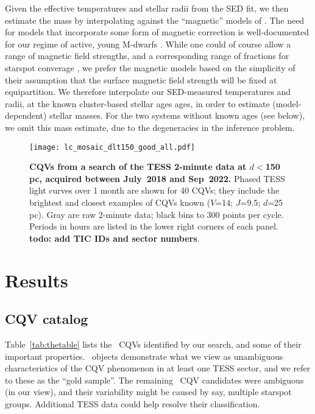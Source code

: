 \documentclass[11pt,twocolumn,tighten]{aastex63}
\begin{document}
Given the effective temperatures and stellar radii from the SED fit,
we then estimate the mass by interpolating against the ``magnetic''
models of \citet{2016A&A...593A..99F}.  The need for models that
incorporate some form of magnetic correction is well-documented for
our regime of active, young M-dwarfs
\citep[e.g.][]{2012ApJ...756...47S,2015ApJ...804..146D,2020ApJ...891...29S}.
While one could of course allow a range of magnetic field strengths,
and a corresponding range of fractions for starspot converage
\citep{2020ApJ...891...29S}, we prefer the magnetic
\citet{2016A&A...593A..99F} models based on the simplicity of their
assumption that the surface magnetic field strength will be fixed at
equipartition.
We therefore interpolate our SED-measured temperatures and radii, at
the known cluster-based stellar ages ages, in order to estimate
(model-dependent) stellar masses.
For the two systems without known ages (see below), we omit this mass
estimate, due to the degeneracies in the inference problem.



\begin{figure*}[!t]
	\begin{center}
		\centering
		\texttt{[image: lc\_mosaic\_dlt150\_good\_all.pdf]}
		\caption{
			{\bf CQVs from a search of the TESS 2-minute data at
				$d$$<$150\,pc, acquired between July~2018 and Sep~2022.}
			Phased TESS light curves over 1 month are shown for 40 CQVs;
			they include the brightest and closest examples of CQVs known
			($V$=14; $J$=9.5; $d$=25\,pc).  Gray are raw 2-minute data;
			black bins to 300 points per cycle.  Periods in hours are listed
			in the lower right corners of each panel.
			{\bf todo:  add TIC IDs and sector numbers}.
		}
		\label{fig:singlemosaic}
	\end{center}
\end{figure*}


\section{Results}
\label{sec:results}

\subsection{CQV catalog}

Table~\ref{tab:thetable} lists the \ncpvsfound\ CQVs identified by our
search, and some of their important properties.  \ngoods\ objects
demonstrate what we view as unambiguous characteristics of the CQV
phenomenon in at least one TESS sector, and we refer to these as the
``gold sample''.  The remaining \nmaybes\ CQV candidates were
ambiguous (in our view), and their variability might be caused by say,
multiple starspot groups.  Additional TESS data could help resolve
their classification.
\end{document}

